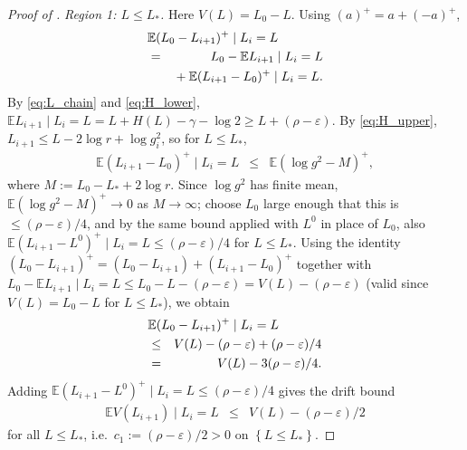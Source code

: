 \documentclass[10pt,a4paper]{amsart}
\newcommand{\Exp}[1]{\mathbb{E} #1}
\newcommand{\Set}[1]{\left\{ #1 \right\}}
\newcommand{\cond}{\mid}
\newcommand{\eps}{\varepsilon}
\begin{document}
\begin{proof}[Proof of ]
  \emph{Region 1: $L \le L_*$.} Here $V(L) = L_0 - L$. Using $(a)^+ = a + (-a)^+$,
  \begin{eqnarray*}
    \lefteqn{\Exp{(L_0 - L_{i+1})^+ \cond L_i = L}} \\
    & = & L_0 - \Exp{L_{i+1} \cond L_i = L} \\
    & & {}+ \Exp{(L_{i+1} - L_0)^+ \cond L_i = L}.
  \end{eqnarray*}
  By \eqref{eq:L_chain} and \eqref{eq:H_lower}, $\Exp{L_{i+1} \cond L_i = L} = L + H(L) - \gamma - \log 2 \ge L + (\rho - \eps)$. By \eqref{eq:H_upper}, $L_{i+1} \le L - 2\log r + \log g_i^2$, so for $L \le L_*$,
  \begin{eqnarray*}
    \Exp{(L_{i+1} - L_0)^+ \cond L_i = L} & \le & \Exp{(\log g^2 - M)^+},
  \end{eqnarray*}
  where $M := L_0 - L_* + 2\log r$.
  Since $\log g^2$ has finite mean, $\Exp{(\log g^2 - M)^+} \to 0$ as $M \to \infty$; choose $L_0$ large enough that this is $\le (\rho - \eps)/4$, and by the same bound applied with $L^0$ in place of $L_0$, also $\Exp{(L_{i+1} - L^0)^+ \cond L_i = L} \le (\rho - \eps)/4$ for $L \le L_*$. Using the identity $(L_0 - L_{i+1})^+ = (L_0 - L_{i+1}) + (L_{i+1} - L_0)^+$ together with $L_0 - \Exp{L_{i+1} \cond L_i = L} \le L_0 - L - (\rho - \eps) = V(L) - (\rho - \eps)$ (valid since $V(L) = L_0 - L$ for $L \le L_*$), we obtain
  \begin{eqnarray*}
    \lefteqn{\Exp{(L_0 - L_{i+1})^+ \cond L_i = L}} \\
    & \le & V(L) - (\rho - \eps) + (\rho - \eps)/4 \\
    & = & V(L) - 3(\rho - \eps)/4.
  \end{eqnarray*}
  Adding $\Exp{(L_{i+1} - L^0)^+ \cond L_i = L} \le (\rho - \eps)/4$ gives the drift bound
  \begin{eqnarray}
    \label{eq:drift_left}
    \Exp{V(L_{i+1}) \cond L_i = L} & \le & V(L) - (\rho - \eps)/2
  \end{eqnarray}
  for all $L \le L_*$, i.e.\ $c_1 := (\rho - \eps)/2 > 0$ on $\Set{L \le L_*}$.


\end{proof}
\end{document}
